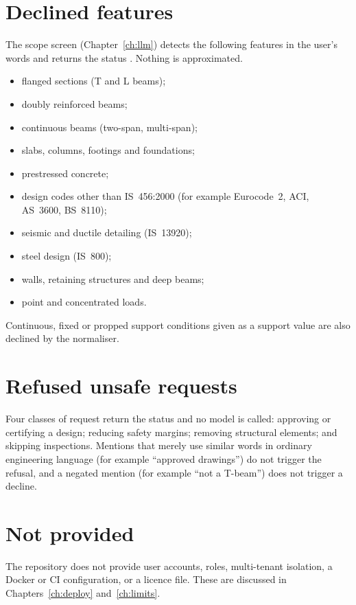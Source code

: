 \section{Declined features}
The scope screen (Chapter~\ref{ch:llm}) detects the following features in the user's words and returns the status . Nothing is approximated.
\begin{itemize}
  \item flanged sections (T and L beams);
  \item doubly reinforced beams;
  \item continuous beams (two-span, multi-span);
  \item slabs, columns, footings and foundations;
  \item prestressed concrete;
  \item design codes other than IS~456:2000 (for example Eurocode~2, ACI, AS~3600, BS~8110);
  \item seismic and ductile detailing (IS~13920);
  \item steel design (IS~800);
  \item walls, retaining structures and deep beams;
  \item point and concentrated loads.
\end{itemize}
Continuous, fixed or propped support conditions given as a support value are also declined by the normaliser.

\section{Refused unsafe requests}
Four classes of request return the status  and no model is called: approving or certifying a design; reducing safety margins; removing structural elements; and skipping inspections. Mentions that merely use similar words in ordinary engineering language (for example ``approved drawings'') do not trigger the refusal, and a negated mention (for example ``not a T-beam'') does not trigger a decline.

\section{Not provided}
The repository does not provide user accounts, roles, multi-tenant isolation, a Docker or CI configuration, or a licence file. These are discussed in Chapters~\ref{ch:deploy} and~\ref{ch:limits}.
